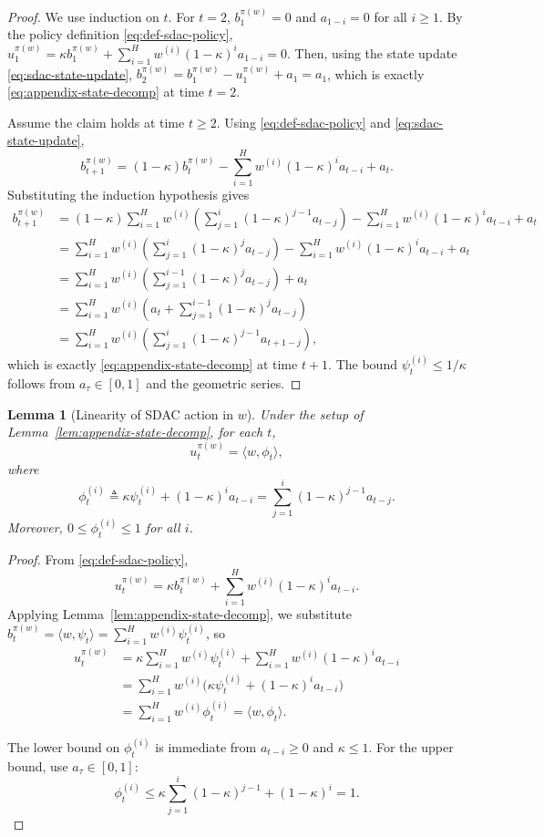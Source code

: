 \documentclass[11pt]{article}
\newtheorem{lemma}{Lemma}
\begin{document}
\begin{proof}
We use induction on $t$. For $t=2$, $b_1^{\pi(w)}=0$ and $a_{1-i}=0$ for all $i\ge 1$. By the policy definition \eqref{eq:def-sdac-policy},
\(u_1^{\pi(w)}=\kappa b_1^{\pi(w)}+\sum_{i=1}^H w^{(i)}(1-\kappa)^i a_{1-i}=0\). Then, using the state update \eqref{eq:sdac-state-update},
\(b_2^{\pi(w)}=b_1^{\pi(w)}-u_1^{\pi(w)}+a_1=a_1\), which is exactly \eqref{eq:appendix-state-decomp} at time $t=2$.

Assume the claim holds at time $t\ge 2$. Using \eqref{eq:def-sdac-policy} and \eqref{eq:sdac-state-update},
\[
b_{t+1}^{\pi(w)}
= (1-\kappa)b_t^{\pi(w)} - \sum_{i=1}^H w^{(i)}(1-\kappa)^i a_{t-i} + a_t.
\]
Substituting the induction hypothesis gives
\[
\begin{aligned}
b_{t+1}^{\pi(w)}
&= (1-\kappa)\sum_{i=1}^H w^{(i)}\!\left(\sum_{j=1}^{i}(1-\kappa)^{j-1}a_{t-j}\right)
    - \sum_{i=1}^H w^{(i)}(1-\kappa)^i a_{t-i} + a_t \\
&= \sum_{i=1}^H w^{(i)}\!\left(\sum_{j=1}^{i}(1-\kappa)^j a_{t-j}\right)
    - \sum_{i=1}^H w^{(i)}(1-\kappa)^i a_{t-i} + a_t \\
&= \sum_{i=1}^H w^{(i)}\!\left(\sum_{j=1}^{i-1}(1-\kappa)^j a_{t-j}\right) + a_t \\
&= \sum_{i=1}^H w^{(i)}\!\left(a_t + \sum_{j=1}^{i-1}(1-\kappa)^j a_{t-j}\right) \\
&= \sum_{i=1}^H w^{(i)}\!\left(\sum_{j=1}^{i}(1-\kappa)^{j-1}a_{t+1-j}\right),
\end{aligned}
\]
which is exactly \eqref{eq:appendix-state-decomp} at time $t+1$. The bound $\psi_t^{(i)}\le 1/\kappa$ follows from $a_\tau\in[0,1]$ and the geometric series.
\end{proof}

\begin{lemma}[Linearity of SDAC action in $w$]
\label{lem:appendix-action-linear}
Under the setup of Lemma~\ref{lem:appendix-state-decomp}, for each $t$,
\[
u_t^{\pi(w)} = \langle w,\phi_t\rangle,
\]
where
\[
\phi_t^{(i)} \triangleq \kappa\psi_t^{(i)} + (1-\kappa)^i a_{t-i}
= \sum_{j=1}^{i}(1-\kappa)^{j-1}a_{t-j}.
\]
Moreover, $0\le \phi_t^{(i)}\le 1$ for all $i$.
\end{lemma}

\begin{proof}
From \eqref{eq:def-sdac-policy},
\[
u_t^{\pi(w)} = \kappa b_t^{\pi(w)} + \sum_{i=1}^H w^{(i)}(1-\kappa)^i a_{t-i}.
\]
Applying Lemma~\ref{lem:appendix-state-decomp}, we substitute
\(b_t^{\pi(w)}=\langle w,\psi_t\rangle=\sum_{i=1}^H w^{(i)}\psi_t^{(i)}\), so
\[
\begin{aligned}
u_t^{\pi(w)}
&= \kappa\sum_{i=1}^H w^{(i)}\psi_t^{(i)} + \sum_{i=1}^H w^{(i)}(1-\kappa)^i a_{t-i} \\
&= \sum_{i=1}^H w^{(i)}\bigl(\kappa\psi_t^{(i)} + (1-\kappa)^i a_{t-i}\bigr) \\
&= \sum_{i=1}^H w^{(i)}\phi_t^{(i)}
= \langle w,\phi_t\rangle.
\end{aligned}
\]

The lower bound on $\phi_t^{(i)}$ is immediate from $a_{t-i}\ge 0$ and $\kappa\le 1$. For the upper bound, use $a_\tau\in[0,1]$:
\[
\phi_t^{(i)}
\le \kappa\sum_{j=1}^{i}(1-\kappa)^{j-1} + (1-\kappa)^i
= 1.
\]
\end{proof}
\end{document}
